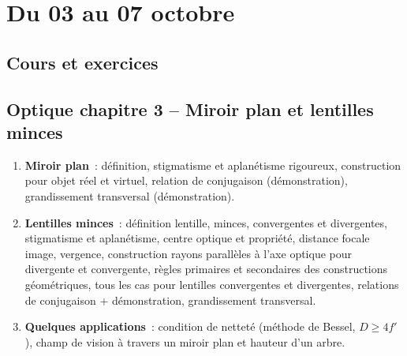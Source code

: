 \documentclass[a4paper, 12pt, final, garamond]{book}
\begin{document}
\setcounter{chapter}{3}

\chapter{Du 03 au 07 octobre}

\section{Cours et exercices}

\section*{Optique chapitre 3 -- Miroir plan et lentilles minces}
\begin{enumerate}[label=\Roman*]
    \item \textbf{Miroir plan}~: définition, stigmatisme et aplanétisme
        rigoureux, construction pour objet réel et virtuel, relation de
        conjugaison (démonstration), grandissement transversal (démonstration).
    \item \textbf{Lentilles minces}~: définition lentille, minces, convergentes
        et divergentes, stigmatisme et aplanétisme, centre optique et propriété,
        distance focale image, vergence, construction rayons parallèles à l'axe
        optique pour divergente et convergente, règles primaires et secondaires
        des constructions géométriques, tous les cas pour lentilles convergentes
        et divergentes, relations de conjugaison + démonstration, grandissement
        transversal.
    \item \textbf{Quelques applications}~: condition de netteté (méthode de
        Bessel, $D \geq 4f'$), champ de vision à travers un miroir plan et
        hauteur d'un arbre.
\end{enumerate}
\end{document}
